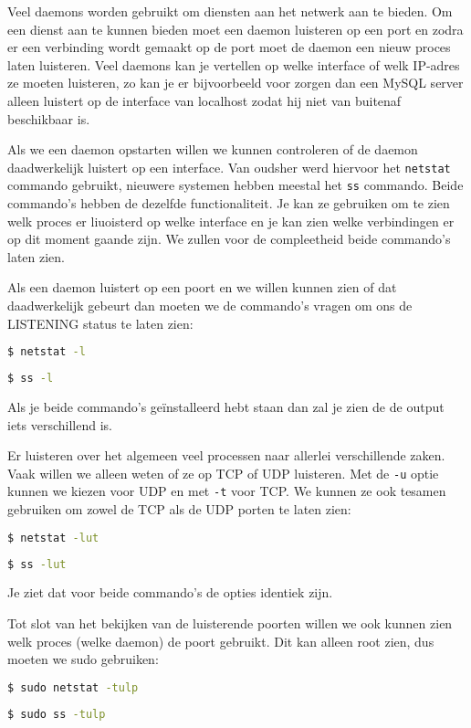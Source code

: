 Veel daemons worden gebruikt om diensten aan het netwerk aan te bieden. Om een dienst aan te kunnen bieden moet een daemon luisteren op een port en zodra er een verbinding wordt gemaakt op de port moet de daemon een nieuw proces laten luisteren. Veel daemons kan je vertellen op welke interface of welk IP-adres ze moeten luisteren, zo kan je er bijvoorbeeld voor zorgen dan een MySQL server alleen luistert op de interface van localhost zodat hij niet van buitenaf beschikbaar is.

Als we een daemon opstarten willen we kunnen controleren of de daemon daadwerkelijk luistert op een interface. Van oudsher werd hiervoor het \texttt{netstat} commando gebruikt, nieuwere systemen hebben meestal het \texttt{ss} commando. Beide commando's hebben de dezelfde functionaliteit. Je kan ze gebruiken om te zien welk proces er liuoisterd op welke interface en je kan zien welke verbindingen er op dit moment gaande zijn. We zullen voor de compleetheid beide commando's laten zien.

Als een daemon luistert op een poort en we willen kunnen zien of dat daadwerkelijk gebeurt dan moeten we de commando's vragen om ons de LISTENING status te laten zien:
\begin{lstlisting}[language=bash]
$ netstat -l
\end{lstlisting}
\begin{lstlisting}[language=bash]
$ ss -l
\end{lstlisting}
Als je beide commando's ge\"installeerd hebt staan dan zal je zien de de output iets verschillend is.

Er luisteren over het algemeen veel processen naar allerlei verschillende zaken. Vaak willen we alleen weten of ze op TCP of UDP luisteren. Met de \texttt{-u} optie kunnen we kiezen voor UDP en met \texttt{-t} voor TCP. We kunnen ze ook tesamen gebruiken om zowel de TCP als de UDP porten te laten zien:
\begin{lstlisting}[language=bash]
$ netstat -lut
\end{lstlisting}
\begin{lstlisting}[language=bash]
$ ss -lut
\end{lstlisting}
Je ziet dat voor beide commando's de opties identiek zijn.

Tot slot van het bekijken van de luisterende poorten willen we ook kunnen zien welk proces (welke daemon) de poort gebruikt. Dit kan alleen root zien, dus moeten we sudo gebruiken:
\begin{lstlisting}[language=bash]
$ sudo netstat -tulp
\end{lstlisting}
\begin{lstlisting}[language=bash]
$ sudo ss -tulp
\end{lstlisting}

